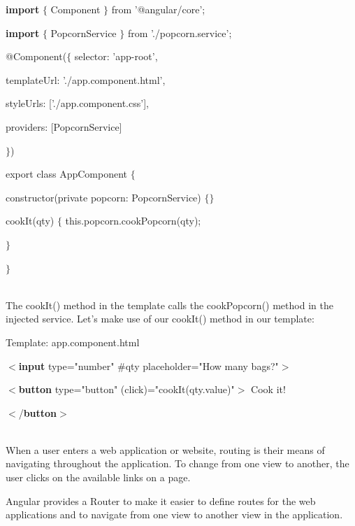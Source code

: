 \documentclass{article}
\begin{document}
\noindent \textbf{import} $\mathrm{\{}$ Component $\mathrm{\}}$ from '@angular/core'; 

\noindent \textbf{import} $\mathrm{\{}$ PopcornService $\mathrm{\}}$ from './popcorn.service';

\noindent @Component($\mathrm{\{}$ selector: 'app-root',

\noindent templateUrl: './app.component.html', 

\noindent styleUrls: ['./app.component.css'], 

\noindent providers: [PopcornService]

\noindent $\mathrm{\}}$)

\noindent export class AppComponent $\mathrm{\{}$

\noindent constructor(private popcorn: PopcornService) $\mathrm{\{}$$\mathrm{\}}$

\noindent cookIt(qty) $\mathrm{\{}$ this.popcorn.cookPopcorn(qty);

\noindent $\mathrm{\}}$

\noindent $\mathrm{\}}$

\noindent 

\noindent \\ The cookIt() method in the template calls the cookPopcorn() method in the injected service. Let's make use of our cookIt() method in our template:

\noindent 

\noindent Template: app.component.html

\noindent $\mathrm{<}$\textbf{input} type="number" \#qty placeholder="How many bags?"$\mathrm{>}$

\noindent $\mathrm{<}$\textbf{button} type="button" (click)="cookIt(qty.value)"$\mathrm{>}$ Cook it!

\noindent $\mathrm{<}$/\textbf{button}$\mathrm{>}$

\newpage 


\noindent 

\noindent \\ When a user enters a web application or website, routing is their means of navigating throughout the application. To change from one view to another, the user clicks on the available links on a page.

\noindent Angular provides a Router to make it easier to define routes for the web applications and to navigate from one view to another view in the application.
\end{document}
